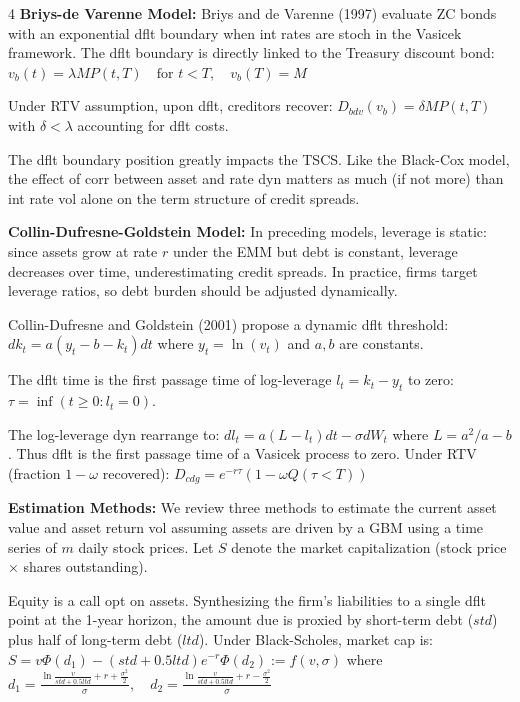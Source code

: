 \documentclass[landscape]{article}
\begin{document}
\begin{multicols}{4}
\textcolor{subsubsectioncolor}{\textbf{Briys-de Varenne Model:}} Briys and de Varenne (1997) evaluate ZC bonds with an exponential dflt boundary when int rates are stoch in the Vasicek framework. The dflt boundary is directly linked to the Treasury discount bond: $v_b(t) = \lambda MP(t,T) \quad \text{for } t < T, \quad v_b(T) = M$

Under RTV assumption, upon dflt, creditors recover: $D_{bdv}(v_b) = \delta MP(t,T)$
with $\delta < \lambda$ accounting for dflt costs.

The dflt boundary position greatly impacts the TSCS. Like the Black-Cox model, the effect of corr between asset and rate dyn matters as much (if not more) than int rate vol alone on the term structure of credit spreads.

\textcolor{subsubsectioncolor}{\textbf{Collin-Dufresne-Goldstein Model:}} In preceding models, leverage is static: since assets grow at rate $r$ under the EMM but debt is constant, leverage decreases over time, underestimating credit spreads. In practice, firms target leverage ratios, so debt burden should be adjusted dynamically.

Collin-Dufresne and Goldstein (2001) propose a dynamic dflt threshold: $dk_t = a(y_t - b - k_t)dt$ where $y_t = \ln(v_t)$ and $a, b$ are constants.

The dflt time is the first passage time of log-leverage $l_t = k_t - y_t$ to zero: $\tau = \inf(t \geq 0: l_t = 0)$.

The log-leverage dyn rearrange to: $dl_t = a(L - l_t)dt - \sigma dW_t$ where $L = a^2/a - b$.
 Thus dflt is the first passage time of a Vasicek process to zero. Under RTV (fraction $1-\omega$ recovered): $D_{cdg} = e^{-r\tau}(1 - \omega Q(\tau < T))$

\textcolor{subsectioncolor}{\textbf{Estimation Methods:}} We review three methods to estimate the current asset value and asset return vol assuming assets are driven by a GBM using a time series of $m$ daily stock prices. Let $S$ denote the market capitalization (stock price $\times$ shares outstanding).

Equity is a call opt on assets. Synthesizing the firm's liabilities to a single dflt point at the 1-year horizon, the amount due is proxied by short-term debt ($std$) plus half of long-term debt ($ltd$). Under Black-Scholes, market cap is: $S = v\Phi(d_1) - (std + 0.5ltd)e^{-r}\Phi(d_2) := f(v, \sigma)$ where $d_1 = \frac{\ln\frac{v}{std + 0.5ltd} + r + \frac{\sigma^2}{2}}{\sigma}, \quad d_2 = \frac{\ln\frac{v}{std + 0.5ltd} + r - \frac{\sigma^2}{2}}{\sigma}$


\end{multicols}
\end{document}
